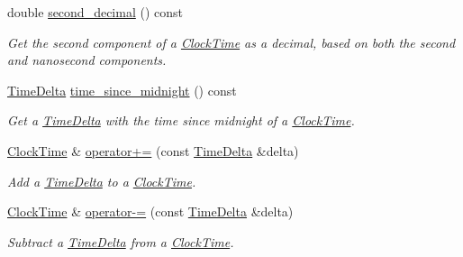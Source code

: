 \begin{DoxyCompactItemize}
double \hyperlink{structClockTime_a2a7cf03e7f0bca581a82333d2d8123da}{second\-\_\-decimal} () const 
\begin{DoxyCompactList}\small\item\em Get the second component of a \hyperlink{structClockTime}{Clock\-Time} as a decimal, based on both the second and nanosecond components. \end{DoxyCompactList}\item 
\hyperlink{structTimeDelta}{Time\-Delta} \hyperlink{structClockTime_a9c6423703cb0026435fb6e5b2d261d54}{time\-\_\-since\-\_\-midnight} () const 
\begin{DoxyCompactList}\small\item\em Get a \hyperlink{structTimeDelta}{Time\-Delta} with the time since midnight of a \hyperlink{structClockTime}{Clock\-Time}. \end{DoxyCompactList}\item 
\hyperlink{structClockTime}{Clock\-Time} \& \hyperlink{structClockTime_a8a98c385f805022b1bc229e472e8c1e9}{operator+=} (const \hyperlink{structTimeDelta}{Time\-Delta} \&delta)
\begin{DoxyCompactList}\small\item\em Add a \hyperlink{structTimeDelta}{Time\-Delta} to a \hyperlink{structClockTime}{Clock\-Time}. \end{DoxyCompactList}\item 
\hyperlink{structClockTime}{Clock\-Time} \& \hyperlink{structClockTime_a50a16387217243bc8986735c7cebd012}{operator-\/=} (const \hyperlink{structTimeDelta}{Time\-Delta} \&delta)
\begin{DoxyCompactList}\small\item\em Subtract a \hyperlink{structTimeDelta}{Time\-Delta} from a \hyperlink{structClockTime}{Clock\-Time}. \end{DoxyCompactList}\end{DoxyCompactItemize}
